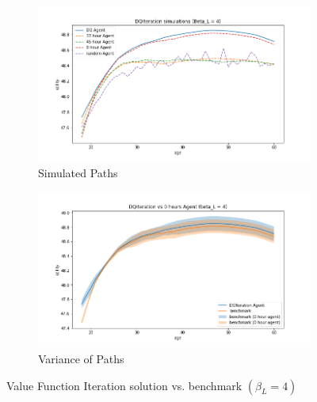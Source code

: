 \begin{figure}[ht]
\begin{subfigure}{.5\textwidth}
  \centering
  \includegraphics[width=1\linewidth]{figures/dqi_model1_beta_4_solution_benchmark_paths.png}
  \caption{Simulated Paths}
  \label{fig:dqi_solution_beta4_path}
\end{subfigure}%
\begin{subfigure}{.5\textwidth}
  \centering
  \includegraphics[width=1\linewidth]{figures/dqi_model1_beta_4_solution_benchmark_variance.png}
  \caption{Variance of Paths}
  \label{fig:dqi_solution_beta4_var}
\end{subfigure}
    \caption{Value Function Iteration solution vs. benchmark $(\beta_L = 4)$}
    \label{fig:dqi_solution_beta4}
\end{figure}

\iffalse

